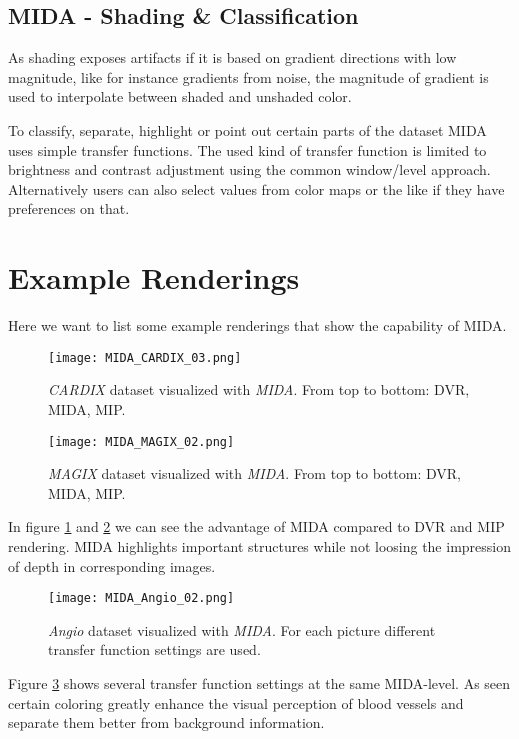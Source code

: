 \subsection{MIDA - Shading \& Classification}

As shading exposes artifacts if it is based on gradient directions with low magnitude, like for instance gradients from noise, the magnitude of gradient is used to interpolate between shaded and unshaded color.

To classify, separate, highlight or point out certain parts of the dataset MIDA uses simple transfer functions.
The used kind of transfer function is limited to brightness and contrast adjustment using the common window/level approach.
Alternatively users can also select values from color maps or the like if they have preferences on that.


\section{Example Renderings}

Here we want to list some example renderings that show the capability of MIDA.

\begin{figure}[h]
	\centering
	\texttt{[image: MIDA\_CARDIX\_03.png]} \\
	\caption{ \emph{CARDIX}\cite{gimias_sampledata_2018} dataset visualized with \emph{MIDA}. From top to bottom: DVR, MIDA, MIP.}
	\label{fig:MIDA_CARDIX_03}
\end{figure}


\begin{figure}[h]
	\centering
	\texttt{[image: MIDA\_MAGIX\_02.png]} \\
	\caption{ \emph{MAGIX}\cite{gimias_sampledata_2018} dataset visualized with \emph{MIDA}. From top to bottom: DVR, MIDA, MIP.}
	\label{fig:MIDA_MAGIX_02}
\end{figure}

In figure \ref{fig:MIDA_CARDIX_03} and \ref{fig:MIDA_MAGIX_02} we can see the advantage of MIDA compared to DVR and MIP rendering. MIDA highlights important structures while not loosing the impression of depth in corresponding images.

\begin{figure}[h]
	\centering
	\texttt{[image: MIDA\_Angio\_02.png]} \\
	\caption{ \emph{Angio}\cite{gimias_sampledata_2018} dataset visualized with \emph{MIDA}. For each picture different transfer function settings are used.}
	\label{fig:MIDA_Angio_02}
\end{figure}

Figure \ref{fig:MIDA_Angio_02} shows several transfer function settings at the same MIDA-level. As seen certain coloring greatly enhance the visual perception of blood vessels and separate them better from background information.
